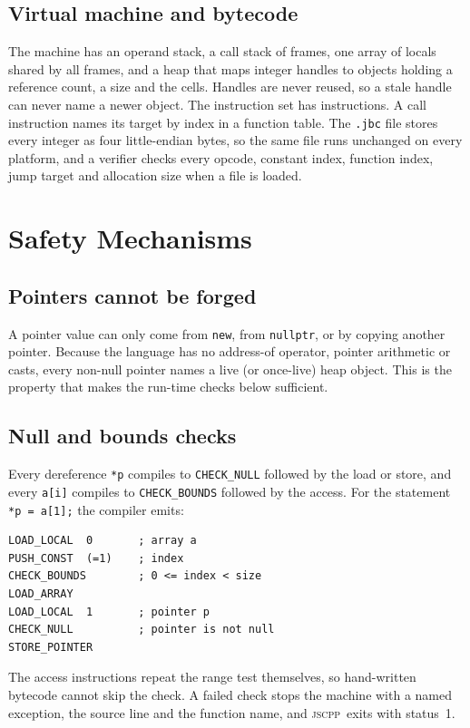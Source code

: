 \documentclass[conference]{IEEEtran}
\newcommand{\jscpp}{\textsc{jscpp}}
\begin{document}
\subsection{Virtual machine and bytecode}
The machine has an operand stack, a call stack of frames, one array of locals shared by all frames, and a heap
that maps integer handles to objects holding a reference count, a size and the cells. Handles are never reused, so
a stale handle can never name a newer object. The instruction set has  instructions. A call
instruction names its target by index in a function table. The \texttt{.jbc} file stores every integer as four
little-endian bytes, so the same file runs unchanged on every platform, and a verifier checks every opcode,
constant index, function index, jump target and allocation size when a file is loaded.

\section{Safety Mechanisms}
\label{sec:safety}

\subsection{Pointers cannot be forged}
A pointer value can only come from \texttt{new}, from \texttt{nullptr}, or by copying another pointer. Because the
language has no address-of operator, pointer arithmetic or casts, every non-null pointer names a live (or
once-live) heap object. This is the property that makes the run-time checks below sufficient.

\subsection{Null and bounds checks}
Every dereference \texttt{*p} compiles to \texttt{CHECK\_NULL} followed by the load or store, and every
\texttt{a[i]} compiles to \texttt{CHECK\_BOUNDS} followed by the access. For the statement \texttt{*p = a[1];}
the compiler emits:
\begin{lstlisting}
LOAD_LOCAL  0       ; array a
PUSH_CONST  (=1)    ; index
CHECK_BOUNDS        ; 0 <= index < size
LOAD_ARRAY
LOAD_LOCAL  1       ; pointer p
CHECK_NULL          ; pointer is not null
STORE_POINTER
\end{lstlisting}
The access instructions repeat the range test themselves, so hand-written bytecode cannot skip the check. A failed
check stops the machine with a named exception, the source line and the function name, and \jscpp\ exits with
status~1.
\end{document}
